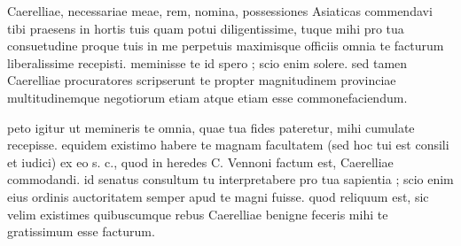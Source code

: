 


 Caerelliae, necessariae meae, rem, nomina, possessiones Asiaticas commendavi tibi praesens in hortis tuis quam potui diligentissime, tuque mihi pro tua consuetudine proque tuis in me perpetuis maximisque officiis omnia te facturum liberalissime recepisti. meminisse te id spero ; scio enim solere. sed tamen Caerelliae procuratores scripserunt te propter magnitudinem provinciae multitudinemque negotiorum etiam atque etiam esse commonefaciendum.

 peto igitur ut memineris te omnia, quae tua fides pateretur, mihi cumulate recepisse. equidem existimo habere te magnam facultatem (sed hoc tui est consili et iudici) ex eo s. c., quod in heredes C. Vennoni factum est, Caerelliae commodandi. id senatus consultum tu interpretabere pro tua sapientia ; scio enim eius ordinis auctoritatem semper apud te magni fuisse. quod reliquum est, sic velim existimes quibuscumque rebus Caerelliae benigne feceris mihi te gratissimum esse facturum.
